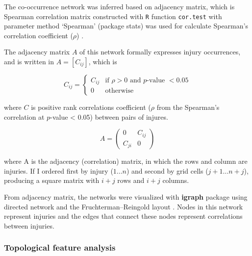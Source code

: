 The co-occurrence network was inferred based on adjacency matrix, which is Spearman correlation matrix constructed with \texttt{R} function \texttt{cor.test} with parameter method `Spearman' (package stats) was used for calculate Spearman's correlation coefficient ($\rho$) \citep{R_2015}.

The adjacency matrix $A$ of this network formally expresses injury occurrences, and is written in $A=[C_{ij}]$, which is

\begin{equation}
C_{ij} = \begin{cases}
C_{ij} & \text{if } \rho > 0  \text{ and }  p\text{-value } < 0.05 \\ 
0 & \text{otherwise}
\end{cases}
\end{equation}

where $C$ is positive rank correlations coefficient ($\rho$ from the Spearman’s correlation at $p$-value < 0.05) between pairs of injures.

\begin{equation}
A = \begin{pmatrix}
0 & C_{ij}\\ 
C_{ji} & 0
\end{pmatrix}
\end{equation}

where A is the adjacency (correlation) matrix, in which the rows and column are injuries. If I ordered first by injury ($1\dots n$) and second by grid cells ($j + 1\dots n + j$), producing a square matrix with $i + j$ rows and $i + j$ columns.

From adjacency matrix, the networks were visualized with \textbf{igraph} package \citep{Csardi_2010_igraph} using directed network and the Fruchterman–Reingold layout \citep{Fruchterman_1991_Graph}. Nodes in this network represent injuries and the edges that connect these nodes represent correlations between injuries.
\subsubsection{Topological feature analysis}

